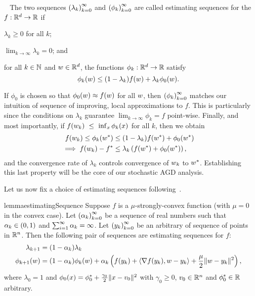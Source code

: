 \begin{definition}~\label{def:estimating_sequences}
    The two sequences \( \left(\lambda_k\right)_{k=0}^\infty \) and \( \left(\phi_k\right)_{k=0}^\infty \) are called estimating sequences for the \( f : \mathbb{R}^d \rightarrow \mathbb{R} \) if
    \begin{inparaenum}[(1)]
        \item \( \lambda_k \geq 0 \) for all \( k \);
        \item \( \lim_{k\rightarrow \infty} \lambda_k = 0 \); and
        \item for all \( k \in \mathbb{N} \) and \( w \in \mathbb{R}^d \), the functions \( \phi_k: \mathbb{R}^d \rightarrow \mathbb{R} \) satisfy
        \[ \phi_k(w) \leq (1 - \lambda_k) f(w) + \lambda_k \phi_0(w). \]
    \end{inparaenum}
\end{definition}

If \( \phi_0 \) is chosen so that \( \phi_0(w) \approx f(w) \) for all \( w \), then \( \left(\phi_k\right)_{k=0}^\infty \) matches our intuition of sequence of improving, local approximations to \( f \).
This is particularly since the conditions on \( \lambda_k \) guarantee \( \lim_{k \rightarrow \infty} \phi_k = f \) point-wise.
Finally, and most importantly, if \( f(w_k)~\leq~\inf_x \phi_k(x) \) for all \( k \), then we obtain
\begin{align}
    f(w_k) \leq \phi_k(w^*) &\leq (1 - \lambda_k) f(w^*) + \phi_0(w^*) \nonumber\\
    \implies f(w_k) - f^* &\leq \lambda_k \left(f(w^*) + \phi_0(w^*)\right),~\label{eq:lambda-bound}
\end{align}
and the convergence rate of \( \lambda_k \) controls convergence of \( w_k \) to \( w^* \).
Establishing this last property will be the core of our stochastic AGD analysis.

Let us now fix a choice of estimating sequences following~\citet[Lemma 2.2.2]{nesterov2004lectures}. 
\begin{restatable}{lemma}{estimatingSequence}\label{lemma:estimating-sequence}
    Suppose \( f \) is a \( \mu \)-strongly-convex function (with \( \mu = 0 \) in the convex case).
    Let \( \left(\alpha_{k}\right)_{k=0}^\infty \) be a sequence of real numbers such that \( \alpha_{k} \in (0,1) \) and \( \sum_{i=1}^\infty \alpha_{k} = \infty \). 
    Let \( \left(y_k\right)_{k=0}^\infty \) be an arbitrary of sequence of points in \( \mathbb{R}^n \).
    Then the following pair of sequences are estimating sequences for \( f \):
    \begin{align*}
        \lambda_{k+1} &= (1- \alpha_k) \lambda_k\\
        \phi_{k+1}(w) &= (1-\alpha_k) \phi_k(w) + \alpha_k \left(f(y_k) + \left\langle\nabla f(y_k), w - y_k\right\rangle + \frac{\mu}{2} \|w - y_k\|^2\right),
    \end{align*}
    where \( \lambda_0 = 1 \) and \( \phi_0(x) = \phi_0^* + \frac{\gamma_0}{2}\|x - v_0\|^2 \) with \( \gamma_0 \geq 0 \), \( v_0 \in \mathbb{R}^n \) and \( \phi_0^* \in \mathbb{R} \) arbitrary.
\end{restatable}

